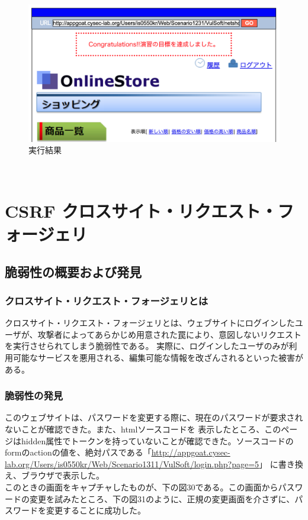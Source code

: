\documentclass[dvipdfmx,autodetect-engine,titlepage]{jsarticle}
\begin{document}
\begin{figure}[H]
  \centering
  \includegraphics[scale=0.35]{sql13.png} 
  \caption{実行結果}\label{fig:図29}
\end{figure}

　

\section{CSRF クロスサイト・リクエスト・フォージェリ}
\subsection{脆弱性の概要および発見}
\subsubsection{クロスサイト・リクエスト・フォージェリとは}
クロスサイト・リクエスト・フォージェリとは、ウェブサイトにログインしたユーザが、攻撃者によってあらかじめ用意された罠により、意図しないリクエストを実行させられてしまう脆弱性である。
実際に、ログインしたユーザのみが利用可能なサービスを悪用される、編集可能な情報を改ざんされるといった被害がある。\\

\subsubsection{脆弱性の発見}
このウェブサイトは、パスワードを変更する際に、現在のパスワードが要求されないことが確認できた。また、htmlソースコードを
表示したところ、このページはhidden属性でトークンを持っていないことが確認できた。ソースコードのformのactionの値を、絶対パスである「\url{http://appgoat.cysec-lab.org/Users/is0550kr/Web/Scenario1311/VulSoft/login.php?page=5}」
に書き換え、ブラウザで表示した。\\
このときの画面をキャプチャしたものが、下の図30である。この画面からパスワードの変更を試みたところ、下の図31のように、正規の変更画面を介さずに、パスワードを変更することに成功した。\\
\end{document}
